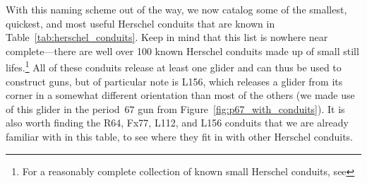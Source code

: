 With this naming scheme out of the way, we now catalog some of the smallest, quickest, and most useful Herschel conduits that are known in Table~\ref{tab:herschel_conduits}. Keep in mind that this list is nowhere near complete---there are well over 100 known Herschel conduits made up of small still lifes.\footnote{For a reasonably complete collection of known small Herschel conduits, see } All of these conduits release at least one glider and can thus be used to construct guns, but of particular note is L156, which releases a glider from its corner in a somewhat different orientation than most of the others (we made use of this glider in the period~$67$ gun from Figure~\ref{fig:p67_with_conduits}). It is also worth finding the R64, Fx77, L112, and L156 conduits that we are already familiar with in this table, to see where they fit in with other Herschel conduits.

